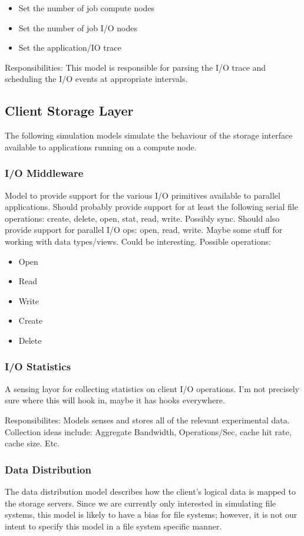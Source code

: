 \documentclass[11pt]{article}
\begin{document}
\begin{itemize}
\item Set the number of job compute nodes
\item Set the number of job I/O nodes
\item Set the application/IO trace
\end{itemize}

Responsibilities:  This model is responsible for parsing the I/O trace and
scheduling the I/O events at appropriate intervals.

\subsection{Client Storage Layer}
The following simulation models simulate the behaviour of the storage
interface available to applications running on a compute node.

\subsubsection{I/O Middleware}
Model to provide support for the various I/O primitives available to parallel
applications.  Should probably provide support for at least the following
serial file operations:  create, delete, open, stat, read, write.  Possibly 
sync.  Should also provide support for parallel I/O ops: open, read, write.
Maybe some stuff for working with data types/views.  Could be interesting.
Possible operations:

\begin{itemize}
\item Open
\item Read
\item Write
\item Create
\item Delete
\end{itemize}

\subsubsection{I/O Statistics}
A sensing layor for collecting statistics on client I/O operations.  I'm not
precisely sure where this will hook in, maybe it has hooks everywhere.

Responsibilites:  Models senses and stores all of the relevant experimental
data.  Collection ideas include:  Aggregate Bandwidth, Operations/Sec, cache
hit rate, cache size.  Etc.

\subsubsection{Data Distribution}
The data distribution model describes how the client's logical data is mapped
to the storage servers.  Since we are currently only interested in simulating
file systems, this model is likely to have a bias for file systems; however, it
is not our intent to specify this model in a file system specific manner.
\end{document}

